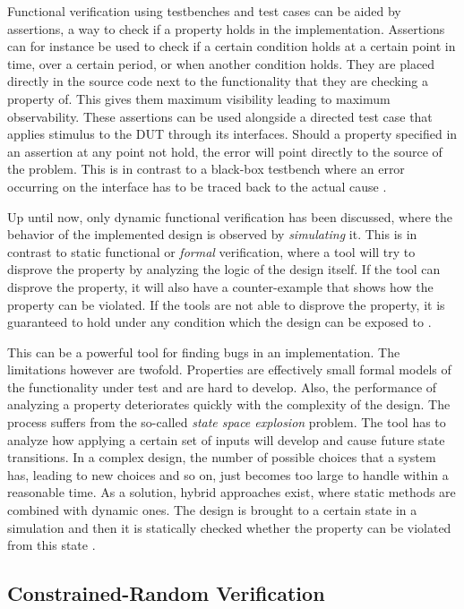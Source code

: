 Functional verification using testbenches and test cases can be aided by assertions, a way to check if a property
holds in the implementation. Assertions can for instance be used to check if a certain condition holds at a certain
point in time, over a certain period, or when another condition holds. They are placed directly in the source
code next to the functionality that they are checking a property of. This gives them maximum visibility leading to
maximum observability. These assertions can be used alongside a directed test case that applies stimulus to the DUT
through its interfaces. Should a property specified in an assertion at any point not hold, the error will point
directly to the source of the problem. This is in contrast to a black-box testbench where an error occurring on the
interface has to be traced back to the actual cause \cite[Ch. 14]{mehta2021introduction}.

Up until now, only dynamic functional verification has been discussed, where the behavior of the implemented design
is observed by \textit{simulating} it. This is in contrast to static functional or \textit{formal} verification,
where a tool will try to disprove the property by analyzing the logic of the design itself. If the tool can
disprove the property, it will also have a counter-example that shows how the property can be violated. If the tools
are not able to disprove the property, it is guaranteed to hold under any condition which the design can be exposed to
\cite[Ch. 14]{mehta2021introduction}.

This can be a powerful tool for finding bugs in an implementation. The limitations however are twofold.
Properties are effectively small formal models of the functionality under test and are hard to develop. Also, the
performance of analyzing a property deteriorates quickly with the complexity of the design. The process suffers from
the so-called \textit{state space explosion} problem. The tool has to analyze how applying a certain set of inputs will
develop and cause future state transitions. In a complex design, the number of possible choices that a system has,
leading to new choices and so on, just becomes too large to handle within a reasonable time. As a solution, hybrid
approaches exist, where static methods are combined with dynamic ones. The design is brought to a certain state in a
simulation and then it is statically checked whether the property can be violated from this state \cite[Ch.
14]{mehta2021introduction}.

\subsection{Constrained-Random Verification} %

